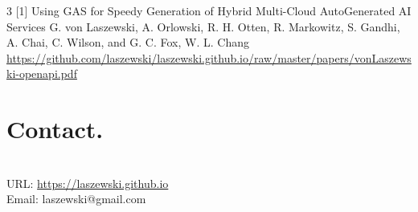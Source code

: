 \documentclass[letter,10pt]{article}
\begin{document}
\begin{multicols}{3}
[1] Using GAS for Speedy Generation of Hybrid Multi-Cloud AutoGenerated AI Services
G. von Laszewski,
A. Orlowski,
R. H. Otten,
R. Markowitz,
S. Gandhi,
A. Chai,
C. Wilson, and
G. C. Fox,
W. L. Chang
\url{https://github.com/laszewski/laszewski.github.io/raw/master/papers/vonLaszewski-openapi.pdf}

%
%

\section*{Contact.} ~\\
URL: \url{https://laszewski.github.io}\\
Email: laszewski@gmail.com


\end{multicols}
\end{document}
